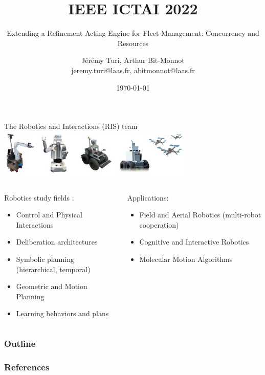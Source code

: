 \documentclass[handout, c,english]{beamer}
\title{IEEE ICTAI 2022}
\subtitle{Extending a Refinement Acting Engine for Fleet Management: Concurrency and Resources}
\author{Jérémy Turi, Arthur Bit-Monnot \\
jeremy.turi@laas.fr, abitmonnot@laas.fr}
\institute{\textit{LAAS-CNRS, Université de Toulouse, CNRS, INSA,} Toulouse, France}
\date{\today}
\begin{document}
\begin{frame}
\titlepage
\end{frame}



\begin{frame}[t]{The Robotics and Interactions (RIS) team}
  \centering
      \includegraphics[width=0.7\textwidth]{images/RIS-robot-banner.jpg}
  
  \begin{columns}[t]
    \begin{column}{0.5\textwidth}
      Robotics study fields :
      \footnotesize
      \begin{itemize}
          \item Control and Physical Interactions
          \item Deliberation architectures
          \item Symbolic planning (hierarchical, temporal)
          \item Geometric and Motion Planning
          \item Learning behaviors and plans
      \end{itemize}
    \end{column}
    \begin{column}{0.5\textwidth}
      Applications:
      \footnotesize
      \begin{itemize}
        \item Field and Aerial Robotics (multi-robot cooperation)
        \item Cognitive and Interactive Robotics
        \item Molecular Motion Algorithms
      \end{itemize}
    \end{column}
  \end{columns}

  
\end{frame}

\begin{frame}
\frametitle{Outline}
\tableofcontents
\end{frame}







%
%
%
\begin{frame}[allowframebreaks]
  \frametitle{References}
  
  
\end{frame}
\end{document}

